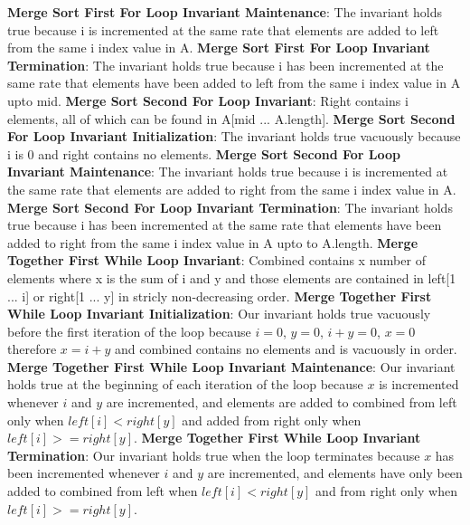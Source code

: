 \documentclass[onecolumn, 12pt, article]{IEEEtran}
\numberwithin{case}{problem}
\numberwithin{condition}{problem}
\numberwithin{condition}{subsection}
\numberwithin{definition}{section}
\theoremstyle{remark}
\numberwithin{question}{problem}
\theoremstyle{plain}
\numberwithin{answer}{problem}
\numberwithin{solution}{section}
\numberwithin{equation}{section}%
\begin{document}
\textbf{Merge Sort First For Loop Invariant Maintenance}: The invariant holds true because i is incremented at the same rate that elements are added to left from the same i index value in A.
\newline
\textbf{Merge Sort First For Loop Invariant Termination}: The invariant holds true because i has been incremented at the same rate that elements have been added to left from the same i index value in A upto mid.
\newline
\newline
\textbf{Merge Sort Second For Loop Invariant}: Right contains i elements, all of which can be found in A[mid ... A.length].
\newline
\textbf{Merge Sort Second For Loop Invariant Initialization}: The invariant holds true vacuously because i is 0 and right contains no elements.
\newline
\textbf{Merge Sort Second For Loop Invariant Maintenance}: The invariant holds true because i is incremented at the same rate that elements are added to right from the same i index value in A.
\newline
\textbf{Merge Sort Second For Loop Invariant Termination}: The invariant holds true because i has been incremented at the same rate that elements have been added to right from the same i index value in A upto to A.length.
\newline
\newline
\textbf{Merge Together First While Loop Invariant}: Combined contains x number of elements where x is the sum of i and y and those elements are contained in left[1 ... i] or right[1 ... y] in stricly non-decreasing order.
\newline
\textbf{Merge Together First While Loop Invariant Initialization}: Our invariant holds true vacuously before the first iteration of the loop because $i = 0$, $y = 0$, $i + y = 0$, $x = 0$ therefore $x = i + y$ and combined contains no elements and is vacuously in order.
\newline
\textbf{Merge Together First While Loop Invariant Maintenance}: Our invariant holds true at the beginning of each iteration of the loop because $x$ is incremented whenever $i$ and $y$ are incremented, and elements are added to combined from left only when $left[i] < right[y]$ and added from right only when $left[i] >= right[y]$.
\newline
\textbf{Merge Together First While Loop Invariant Termination}: Our invariant holds true when the loop terminates because $x$ has been incremented whenever $i$ and $y$ are incremented, and elements have only been added to combined from left when $left[i] < right[y]$ and from right only when $left[i] >= right[y]$.
\end{document}
